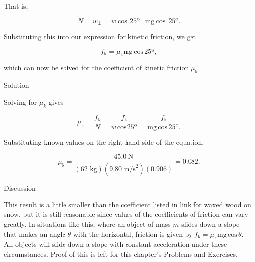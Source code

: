 \documentclass[
]{book}
\newenvironment{tinysection}{}{}
\begin{document}
That is,

\leavevmode\hypertarget{eip-302}{}%
\[{{{{N = w_{\bot}} = w}\ \text{cos}\,{\text{25º} = \text{mg}\ \text{cos}}\,\text{25º}}.}{}\]

Substituting this into our expression for kinetic friction, we get

\leavevmode\hypertarget{eip-134}{}%
\[{{f_{\text{k}} = \mu_{\text{k}}}\text{mg}\ \text{cos}\,\text{25º}}{},\]

which can now be solved for the coefficient of kinetic friction
\(\mu_{\text{k}}{}\).

\begin{tinysection}

{Solution}

\end{tinysection}

Solving for \(\mu_{k}{}\) gives

\leavevmode\hypertarget{eip-322}{}%
\[{{{\mu_{\text{k}} = \frac{f_{\text{k}}}{N}} = \frac{f_{\text{k}}}{w\,\text{cos}\,\text{25º}}} = \frac{f_{\text{k}}}{\text{mg}\,\text{cos}\,\text{25º}.}}{}\]

Substituting known values on the right-hand side of the equation,

\leavevmode\hypertarget{eip-97}{}%
\[{{{\mu_{\text{k}} = \frac{\text{45.0\ N}}{(\text{62\ kg})(9\text{.}\text{80\ m}\text{/s}^{2})(0\text{.}\text{906})}} = 0}\text{.}\text{082}.}{}\]

\begin{tinysection}

{Discussion}

\end{tinysection}

This result is a little smaller than the coefficient listed in
\protect\hyperlink{import-auto-id1165298658126}{link} for waxed
wood on snow, but it is still reasonable since values of the
coefficients of friction can vary greatly. In situations like this,
where an object of mass \(m\) slides down a slope that makes an angle
\(\theta\) with the horizontal, friction is given by
\({{f_{\text{k}} = \mu_{\text{k}}}\text{mg}\,\text{cos}\,\theta}{}\). All
objects will slide down a slope with constant acceleration under these
circumstances. Proof of this is left for this chapter's Problems and
Exercises.
\end{document}
